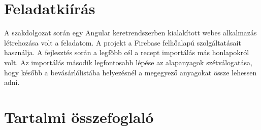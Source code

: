\documentclass[12pt]{report}
\theoremstyle{definition}
\begin{document}
\chapter*{Feladatkiírás}

A szakdolgozat során egy Angular keretrendszerben kialakított webes alkalmazás létrehozása volt a feladatom. A projekt a Firebase felhőalapú szolgáltatásait használja. A fejlesztés során a legfőbb cél a recept importálás más honlapokról volt. Az importálás második legfontosabb lépése az alapanyagok szétválogatása, hogy később a bevásárlólistába helyezésnél a megegyező anyagokat össze lehessen adni.

\chapter*{Tartalmi összefoglaló}
\end{document}
